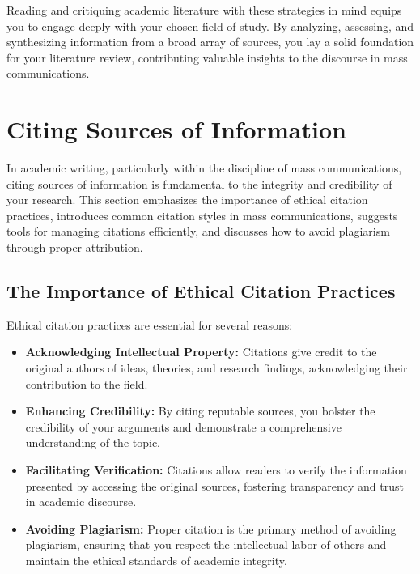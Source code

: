 \documentclass[
]{book}
\providecommand{\tightlist}{%
  \setlength{\itemsep}{0pt}\setlength{\parskip}{0pt}}
\begin{document}
Reading and critiquing academic literature with these strategies in mind equips you to engage deeply with your chosen field of study. By analyzing, assessing, and synthesizing information from a broad array of sources, you lay a solid foundation for your literature review, contributing valuable insights to the discourse in mass communications.

\hypertarget{citing-sources-of-information}{%
\section{Citing Sources of Information}\label{citing-sources-of-information}}

In academic writing, particularly within the discipline of mass communications, citing sources of information is fundamental to the integrity and credibility of your research. This section emphasizes the importance of ethical citation practices, introduces common citation styles in mass communications, suggests tools for managing citations efficiently, and discusses how to avoid plagiarism through proper attribution.

\hypertarget{the-importance-of-ethical-citation-practices}{%
\subsection*{The Importance of Ethical Citation Practices}\label{the-importance-of-ethical-citation-practices}}

Ethical citation practices are essential for several reasons:

\begin{itemize}
\tightlist
\item
  \textbf{Acknowledging Intellectual Property:} Citations give credit to the original authors of ideas, theories, and research findings, acknowledging their contribution to the field.
\item
  \textbf{Enhancing Credibility:} By citing reputable sources, you bolster the credibility of your arguments and demonstrate a comprehensive understanding of the topic.
\item
  \textbf{Facilitating Verification:} Citations allow readers to verify the information presented by accessing the original sources, fostering transparency and trust in academic discourse.
\item
  \textbf{Avoiding Plagiarism:} Proper citation is the primary method of avoiding plagiarism, ensuring that you respect the intellectual labor of others and maintain the ethical standards of academic integrity.
\end{itemize}
\end{document}

